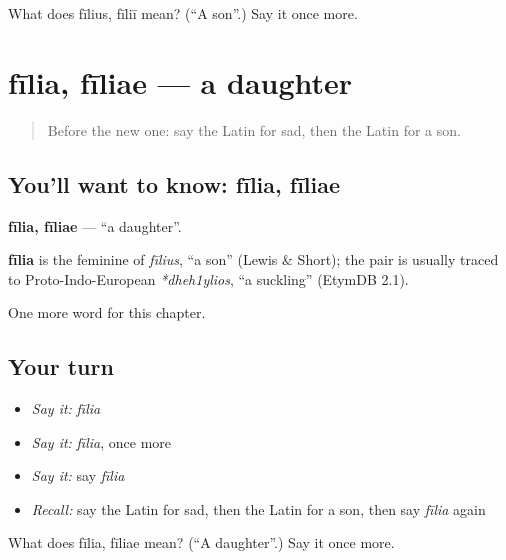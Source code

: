 \begin{tcolorbox}[breakable,colback=teal!4,colframe=teal!35!black,title={Before you move on}]
What does fīlius, fīliī mean? (\textquotedblleft{}A son\textquotedblright{}.) Say it once more.
\end{tcolorbox}
\section[fīlia, fīliae]{fīlia, fīliae — a daughter}

\label{lesson:LA-C70-filia}



\begin{quote}
Before the new one: say the Latin for sad, then the Latin for a son.
\end{quote}

\subsection*{You'll want to know: fīlia, fīliae}
\textbf{fīlia, fīliae} — \textquotedblleft{}a daughter\textquotedblright{}.

\begin{cousinweb}
\textbf{fīlia} is the feminine of \emph{fīlius}, \textquotedblleft{}a son\textquotedblright{} (Lewis \& Short); the pair is usually traced to Proto-Indo-European \emph{*dheh1ylios}, \textquotedblleft{}a suckling\textquotedblright{} (EtymDB 2.1).
\end{cousinweb}

\begin{grammarlens}[title={What you've built}]
One more word for this chapter.
\end{grammarlens}

\subsection*{Your turn}
\begin{itemize}
\raggedright
  \item \emph{Say it:} \emph{fīlia}
  \item \emph{Say it:} \emph{fīlia}, once more
  \item \emph{Say it:} say \emph{fīlia}
  \item \emph{Recall:} say the Latin for sad, then the Latin for a son, then say \emph{fīlia} again
\end{itemize}

\begin{tcolorbox}[breakable,colback=teal!4,colframe=teal!35!black,title={Before you move on}]
What does fīlia, fīliae mean? (\textquotedblleft{}A daughter\textquotedblright{}.) Say it once more.
\end{tcolorbox}
